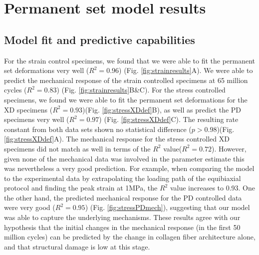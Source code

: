 

\section{Permanent set model results}
\subsection{Model fit and predictive capabilities}


	For the strain control specimens, we found that we were able to fit the permanent set deformations very well ($R^2 = 0.96$) (Fig. \ref{fig:strainresults}A). We were able to predict the mechanical response of the strain controlled specimens at 65 million cycles ($R^2 = 0.83$) (Fig. \ref{fig:strainresults}B\&C). 
	For the stress controlled specimens, we found we were able to fit the permanent set deformations for the XD specimens ($R^2 = 0.93$)(Fig. \ref{fig:stressXDdef}B), as well as predict the PD specimens very well ($R^2 = 0.97$) (Fig. \ref{fig:stressXDdef}C). 
	The resulting rate constant from both data sets shown no statistical difference ($p > 0.98$)(Fig. \ref{fig:stressXDdef}A). 
The mechanical response for the stress controlled XD specimens did not match as well in terms of the $R^2$ value($R^2 = 0.72$). 
	However, given none of the mechanical data was involved in the parameter estimate this was nevertheless a very good prediction. 
	For example, when comparing the model to the experimental data by extrapolating the loading path of the equibiaxial protocol and finding the peak strain at 1MPa, the $R^2$ value increases to 0.93. 
	One the other hand, the predicted mechanical response for the PD controlled data were very good ($R^2 = 0.95$) (Fig. \ref{fig:stressPDmech}), suggesting that our model was able to capture the underlying mechanisms. 
	These results agree with our hypothesis that the initial changes in the mechanical response (in the first 50 million cycles) can be predicted by the change in collagen fiber architecture alone, and that structural damage is low at this stage. 


